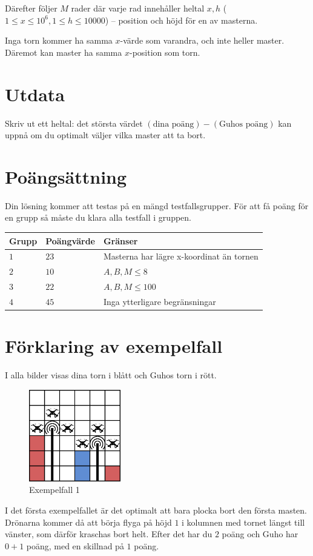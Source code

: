 Därefter följer $M$ rader där varje rad innehåller heltal $x,h$ ($1 \leq x \leq 10^6, 1\leq h \leq 10000$) -- position och höjd för en av masterna.

Inga torn kommer ha samma $x$-värde som varandra, och inte heller master.
Däremot kan master ha samma $x$-position som torn.

\section*{Utdata}
Skriv ut ett heltal: det största värdet $(\text{dina poäng}) - (\text{Guhos poäng})$ kan uppnå om du optimalt väljer vilka master att ta bort.

\section*{Poängsättning}
Din lösning kommer att testas på en mängd testfallsgrupper.
För att få poäng för en grupp så måste du klara alla testfall i gruppen.

\noindent
\begin{tabular}{| l | l | p{12cm} |}
  \hline
  Grupp & Poängvärde & Gränser \\ \hline
  $1$   & $23$       & Masterna har lägre x-koordinat än tornen \\ \hline
  $2$   & $10$       & $A,B,M \leq 8$\\ \hline
  $3$   & $22$       & $A,B,M \leq 100$  \\ \hline
  $4$   & $45$       & Inga ytterligare begränsningar  \\ \hline
\end{tabular}

\section*{Förklaring av exempelfall}
I alla bilder visas dina torn i blått och Guhos torn i rött.

\begin{figure}[!h]
  \centering
  \includegraphics[width=4cm]{sample1.png}
  \caption{Exempelfall 1}
\end{figure}
I det första exempelfallet är det optimalt att bara plocka bort den första masten.
Drönarna kommer då att börja flyga på höjd $1$ i kolumnen med tornet längst till vänster, som därför kraschas bort helt.
Efter det har du $2$ poäng och Guho har $0+1$ poäng, med en skillnad på $1$ poäng.

